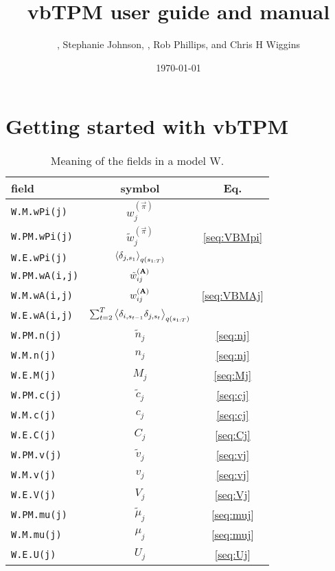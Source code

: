 \documentclass[11pt,letterpaper,twocolumn]{article}
\title{vbTPM user guide and manual}
\author{\ml{Martin Lind\'en}, Stephanie Johnson, \jwm{Jan-Willem van
    de Meent}, Rob Phillips, and Chris H Wiggins}
\date{\today}
\newcommand{\vbparbox}[1]{\parbox[t]{0.4\columnwidth}{
    \rule[5pt]{0pt}{5pt} #1 \rule[-3pt]{0pt}{5pt}}}
\begin{document}
\maketitle
\tableofcontents

\section{Getting started with vbTPM}

\begin{table*}
\caption{Meaning of the fields in a model W. }
  \begin{tabular}{|l|c|c|}
    \hline
    field & symbol & Eq.\\
    \hline\hline

    \verb+W.M.wPi(j)+& $ w_j^{(\vec{\pi})}$    & \\ 
    \verb+W.PM.wPi(j)+& $\tilde w_j^{(\vec{\pi})}$    & \eqref{seq:VBMpi}\\ 
    \verb+W.E.wPi(j)+& $\left\langle \delta_{j,s_1}\right\rangle_{q(s_{1:T})}$ & \\ 
    \hline
    
    \verb+W.PM.wA(i,j)+& $\tilde w_{ij}^{(\mathbf{A})}$& \\ 
    \verb+W.M.wA(i,j)+& $w_{ij}^{(\mathbf{A})}$& \eqref{seq:VBMAj}\\ 
    \verb+W.E.wA(i,j)+& $\sum_{t=2}^T\left\langle \delta_{i,s_{t-1}}\delta_{j,s_t}\right\rangle_{q(s_{1:T})}$
    & \\ 
    \hline
    \verb+W.PM.n(j)+& $\tilde n_j$& \eqref{seq:nj}\\ 
    \verb+W.M.n(j)+& $n_j$& \eqref{seq:nj}\\ 
    \verb+W.E.M(j)+& $M_j$& \eqref{seq:Mj}\\ 
    \hline
    \verb+W.PM.c(j)+& $\tilde c_j$& \eqref{seq:cj}\\ 
    \verb+W.M.c(j)+& $c_j$& \eqref{seq:cj}\\ 
    \verb+W.E.C(j)+& $C_j$&\eqref{seq:Cj}\\
    \hline
    \verb+W.PM.v(j)+& $\tilde v_j$& \eqref{seq:vj}\\ 
    \verb+W.M.v(j)+& $v_j$& \eqref{seq:vj}\\ 
    \verb+W.E.V(j)+& $V_j$& \eqref{seq:Vj}\\ 
    \hline
    \verb+W.PM.mu(j)+& $\tilde \mu_j$& \eqref{seq:muj}\\
    \verb+W.M.mu(j)+& $\mu_j$& \eqref{seq:muj}\\  
    \verb+W.E.U(j)+& $U_j$&\eqref{seq:Uj}\\
    \hline


\end{tabular}
\end{table*}
\end{document}
